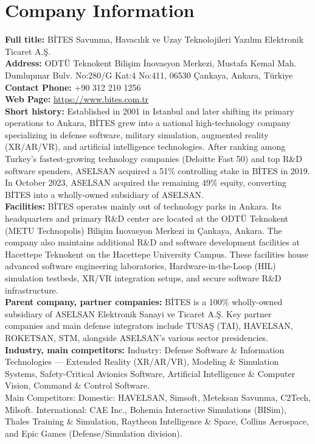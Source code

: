 \documentclass[12pt]{article}
\begin{document}
\section{Company Information}
\label{sec:company-info}
\textbf{Full title:} BİTES Savunma, Havacılık ve Uzay Teknolojileri Yazılım Elektronik Ticaret A.\c{S}.\\
\textbf{Address: }ODTÜ Teknokent Bilişim İnovasyon Merkezi, Mustafa Kemal Mah. Dumlupınar Bulv. No:280/G Kat:4 No:411, 06530 Çankaya, Ankara, Türkiye\\
\textbf{Contact Phone: }+90 312 210 1256\\
\textbf{Web Page: }\url{https://www.bites.com.tr}\\
\textbf{Short history:} Established in 2001 in Istanbul and later shifting its primary operations to Ankara, BİTES grew into a national high-technology company specializing in defense software, military simulation, augmented reality (XR/AR/VR), and artificial intelligence technologies. After ranking among Turkey's fastest-growing technology companies (Deloitte Fast 50) and top R\&D software spenders, ASELSAN acquired a 51\% controlling stake in BİTES in 2019. In October 2023, ASELSAN acquired the remaining 49\% equity, converting BİTES into a wholly-owned subsidiary of ASELSAN.\\
\textbf{Facilities:} BİTES operates mainly out of technology parks in Ankara. Its headquarters and primary R\&D center are located at the ODTÜ Teknokent (METU Technopolis) Bilişim İnovasyon Merkezi in Çankaya, Ankara. The company also maintains additional R\&D and software development facilities at Hacettepe Teknokent on the Hacettepe University Campus. These facilities house advanced software engineering laboratories, Hardware-in-the-Loop (HIL) simulation testbeds, XR/VR integration setups, and secure software R\&D infrastructure.\\
\textbf{Parent company, partner companies:} BİTES is a 100\% wholly-owned subsidiary of ASELSAN Elektronik Sanayi ve Ticaret A.\c{S}. Key partner companies and main defense integrators include TUSAŞ (TAI), HAVELSAN, ROKETSAN, STM, alongside ASELSAN's various sector presidencies.\\
\textbf{Industry, main competitors:} Industry: Defense Software \& Information Technologies — Extended Reality (XR/AR/VR), Modeling \& Simulation Systems, Safety-Critical Avionics Software, Artificial Intelligence \& Computer Vision, Command \& Control Software.\\
Main Competitors: Domestic: HAVELSAN, Simsoft, Meteksan Savunma, C2Tech, Milsoft. International: CAE Inc., Bohemia Interactive Simulations (BISim), Thales Training \& Simulation, Raytheon Intelligence \& Space, Collins Aerospace, and Epic Games (Defense/Simulation division).\\
\end{document}
